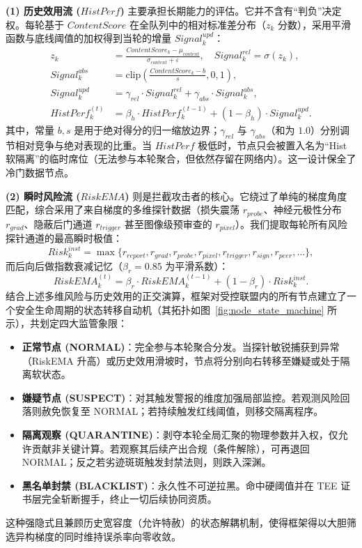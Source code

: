 \documentclass[11pt, a4paper, UTF8, fontset=fandol]{ctexart}
\begin{document}
\textbf{(1) 历史效用流 ($HistPerf$)} 主要承担长期能力的评估。它并不含有“判负”决定权。每轮基于 $ContentScore$ 在全队列中的相对标准差分布（$z_k$ 分数），采用平滑函数与底线阈值的加权得到当轮的增量 $Signal_k^{upd}$：
\begin{align}
    z_{k} &= \frac{ContentScore_{k} - \mu_{content}}{\sigma_{content} + \varepsilon}, \quad Signal_{k}^{rel} = \sigma(z_{k}), \\
    Signal_{k}^{abs} &= \mathrm{clip}\left(\frac{ContentScore_{k} - b}{s}, 0, 1\right), \\
    Signal_{k}^{upd} &= \gamma_{rel} \cdot Signal_{k}^{rel} + \gamma_{abs} \cdot Signal_{k}^{abs}, \\
    HistPerf_{k}^{(t)} &= \beta_{h} \cdot HistPerf_{k}^{(t-1)} + (1 - \beta_{h}) \cdot Signal_{k}^{upd}.
\end{align}
其中，常量 $b, s$ 是用于绝对得分的归一缩放边界；$\gamma_{rel}$ 与 $\gamma_{abs}$（和为 $1.0$）分别调节相对竞争与绝对表现的比重。当 $HistPerf$ 极低时，节点只会被置入名为“Hist软隔离”的临时席位（无法参与本轮聚合，但依然存留在网络内）。这一设计保全了冷门数据节点。

\textbf{(2) 瞬时风险流 ($RiskEMA$)} 则是拦截攻击者的核心。它绕过了单纯的梯度角度匹配，综合采用了来自梯度的多维探针数据（损失震荡 $r_{probe}$、神经元极性分布 $r_{grad}$、隐蔽后门通道 $r_{trigger}$ 甚至图像级预审查的 $r_{pixel}$）。我们提取每轮所有风险探针通道的最高瞬时极值：
\begin{equation}
    Risk_{k}^{inst} = \max\{r_{report}, r_{grad}, r_{probe}, r_{pixel}, r_{trigger}, r_{sign}, r_{peer}, \dots \},
\end{equation}
而后向后做指数衰减记忆（$\beta_r = 0.85$ 为平滑系数）：
\begin{equation}
    RiskEMA_{k}^{(t)} = \beta_{r} \cdot RiskEMA_{k}^{(t-1)} + (1 - \beta_{r}) \cdot Risk_{k}^{inst}.
\end{equation}
结合上述多维风险与历史效用的正交演算，框架对受控联盟内的所有节点建立了一个安全生命周期的状态转移自动机（其拓扑如图~\ref{fig:node_state_machine} 所示），共划定四大监管象限：
\begin{itemize}
    \item \textbf{正常节点 (NORMAL)}：完全参与本轮聚合分发。当探针敏锐捕获到异常（RiskEMA 升高）或历史效用滑坡时，节点将分别向右转移至嫌疑或处于隔离软状态。
    \item \textbf{嫌疑节点 (SUSPECT)}：对其触发警报的维度加强局部监控。若观测风险回落则赦免恢复至 NORMAL；若持续触发红线阈值，则移交隔离程序。
    \item \textbf{隔离观察 (QUARANTINE)}：剥夺本轮全局汇聚的物理参数并入权，仅允许贡献非关键计算。若观察其后续产出合规（条件解除），可再退回 NORMAL；反之若劣迹斑斑触发封禁法则，则跌入深渊。
    \item \textbf{黑名单封禁 (BLACKLIST)}：永久性不可逆拉黑。命中硬阈值并在 TEE 证书层完全斩断握手，终止一切后续协同资质。
\end{itemize}
这种强隐式且兼顾历史宽容度（允许特赦）的状态解耦机制，使得框架得以大胆筛选异构梯度的同时维持误杀率向零收敛。
\end{document}
